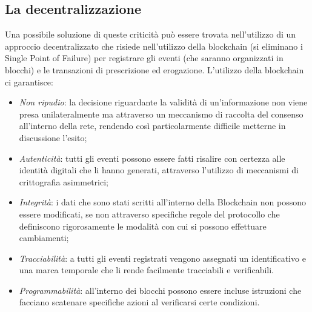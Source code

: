 \subsection{La decentralizzazione}
Una possibile soluzione di queste criticità può essere trovata nell'utilizzo di un approccio decentralizzato che risiede nell'utilizzo della blockchain (si eliminano i Single Point of Failure) per registrare gli eventi (che saranno organizzati in blocchi) e le transazioni di prescrizione ed erogazione.  L'utilizzo della blockchain ci garantisce:
\begin{itemize}
	\item \emph{Non ripudio}: la decisione riguardante la validità di un’informazione non viene presa unilateralmente ma attraverso un meccanismo di raccolta del consenso all’interno della rete, rendendo così particolarmente difficile metterne in discussione l’esito;
	\item \emph{Autenticità}: tutti gli eventi possono essere fatti risalire con certezza alle identità digitali che li hanno generati, attraverso l’utilizzo di meccanismi di crittografia asimmetrici;
	\item \emph{Integrità}: i dati che sono stati scritti all’interno della Blockchain non possono essere modificati, se non attraverso specifiche regole del protocollo che definiscono rigorosamente le modalità con cui si possono effettuare cambiamenti;
	\item \emph{Tracciabilità}: a tutti gli eventi registrati vengono assegnati un identificativo e una marca temporale che li rende facilmente tracciabili e verificabili.
	\item \emph{Programmabilità}: all’interno dei blocchi possono essere incluse istruzioni che facciano scatenare specifiche azioni al verificarsi certe condizioni.
\end{itemize}
